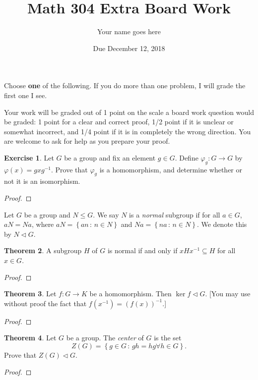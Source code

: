 \documentclass[11pt]{article}		%
\title{Math 304 Extra Board Work}
\author{Your name goes here}
\date{Due December 12, 2018}
\theoremstyle{definition}
\newtheorem{theorem}{Theorem}
\newtheorem{exercise}[theorem]{Exercise}
\def\setof#1#2{{\left\{#1\,\colon\,#2\right\}}}
\begin{document}
\maketitle

Choose \textbf{one} of the following. If you do more than one problem, I will grade the first one I see. 

Your work will be graded out of 1 point on the scale a board work question would be graded: 1 point for a clear and correct proof, 1/2 point if it is unclear or somewhat incorrect, and 1/4 point if it is in completely the wrong direction. You are welcome to ask for help as you prepare your proof.
 
\begin{exercise}
	Let $G$ be a group and fix an element $g\in G$.
	Define $\varphi_g : G\to G$ by $\varphi(x) = g x g^{-1}$.
	Prove that $\varphi_g$ is a homomorphism, and determine whether or not it is an isomorphism. 
\end{exercise}

\begin{proof}

\end{proof}


Let $G$ be a group and $N\leq G$.
We say $N$ is a \emph{normal} subgroup if for all $a\in G$, $a N = Na$, where $aN = \setof{an}{n\in N}$ and $Na = \setof{na}{n\in N}$.
We denote this by $N\vartriangleleft G$.

\begin{theorem}
	A subgroup $H$ of $G$ is normal if and only if $x H x^{-1}\subseteq H$ for all $x\in G$.
\end{theorem}

\begin{proof}

\end{proof}


\begin{theorem}
	Let $f : G\to K$ be a homomorphism.
	Then $\ker f \vartriangleleft G$.
	[You may use without proof the fact that $f(x^{-1}) = (f(x))^{-1}$.]
\end{theorem}

\begin{proof}

\end{proof}

\begin{theorem}
	Let $G$ be a group.
	The \emph{center} of $G$ is the set
	\[
		Z(G) = \setof{g\in G}{gh=hg \forall h\in G}.
	\]
	Prove that $Z(G)\vartriangleleft G$.
\end{theorem}

\begin{proof}

\end{proof}
\end{document}

